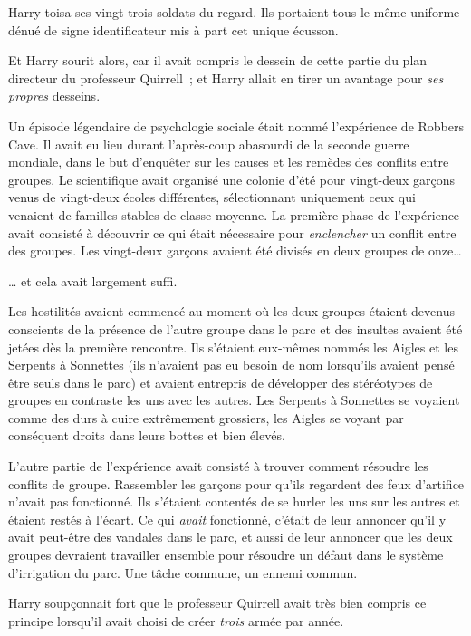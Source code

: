 Harry toisa ses vingt-trois soldats du regard. Ils portaient tous le même uniforme dénué de signe identificateur mis à part cet unique écusson.

Et Harry sourit alors, car il avait compris le dessein de cette partie du plan directeur du professeur Quirrell~; et Harry allait en tirer un avantage pour \emph{ses propres} desseins.

Un épisode légendaire de psychologie sociale était nommé l'expérience de Robbers Cave. Il avait eu lieu durant l'après-coup abasourdi de la seconde guerre mondiale, dans le but d'enquêter sur les causes et les remèdes des conflits entre groupes. Le scientifique avait organisé une colonie d'été pour vingt-deux garçons venus de vingt-deux écoles différentes, sélectionnant uniquement ceux qui venaient de familles stables de classe moyenne. La première phase de l'expérience avait consisté à découvrir ce qui était nécessaire pour \emph{enclencher} un conflit entre des groupes. Les vingt-deux garçons avaient été divisés en deux groupes de onze…

… et cela avait largement suffi.

Les hostilités avaient commencé au moment où les deux groupes étaient devenus conscients de la présence de l'autre groupe dans le parc et des insultes avaient été jetées dès la première rencontre. Ils s'étaient eux-mêmes nommés les Aigles et les Serpents à Sonnettes (ils n'avaient pas eu besoin de nom lorsqu'ils avaient pensé être seuls dans le parc) et avaient entrepris de développer des stéréotypes de groupes en contraste les uns avec les autres. Les Serpents à Sonnettes se voyaient comme des durs à cuire extrêmement grossiers, les Aigles se voyant par conséquent droits dans leurs bottes et bien élevés.

L'autre partie de l'expérience avait consisté à trouver comment résoudre les conflits de groupe. Rassembler les garçons pour qu'ils regardent des feux d'artifice n'avait pas fonctionné. Ils s'étaient contentés de se hurler les uns sur les autres et étaient restés à l'écart. Ce qui \emph{avait} fonctionné, c'était de leur annoncer qu'il y avait peut-être des vandales dans le parc, et aussi de leur annoncer que les deux groupes devraient travailler ensemble pour résoudre un défaut dans le système d'irrigation du parc. Une tâche commune, un ennemi commun.

Harry soupçonnait fort que le professeur Quirrell avait très bien compris ce principe lorsqu'il avait choisi de créer \emph{trois} armée par année.

